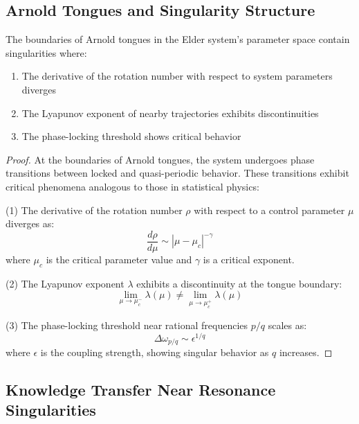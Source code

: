 \subsection{Arnold Tongues and Singularity Structure}

\begin{theorem}
The boundaries of Arnold tongues in the Elder system's parameter space contain singularities where:
\begin{enumerate}
    \item The derivative of the rotation number with respect to system parameters diverges
    \item The Lyapunov exponent of nearby trajectories exhibits discontinuities
    \item The phase-locking threshold shows critical behavior
\end{enumerate}
\end{theorem}

\begin{proof}
At the boundaries of Arnold tongues, the system undergoes phase transitions between locked and quasi-periodic behavior. These transitions exhibit critical phenomena analogous to those in statistical physics:

(1) The derivative of the rotation number $\rho$ with respect to a control parameter $\mu$ diverges as:
\begin{equation}
\frac{d\rho}{d\mu} \sim |\mu - \mu_c|^{-\gamma}
\end{equation}
where $\mu_c$ is the critical parameter value and $\gamma$ is a critical exponent.

(2) The Lyapunov exponent $\lambda$ exhibits a discontinuity at the tongue boundary:
\begin{equation}
\lim_{\mu \to \mu_c^-} \lambda(\mu) \neq \lim_{\mu \to \mu_c^+} \lambda(\mu)
\end{equation}

(3) The phase-locking threshold near rational frequencies $p/q$ scales as:
\begin{equation}
\Delta \omega_{p/q} \sim \epsilon^{1/q}
\end{equation}
where $\epsilon$ is the coupling strength, showing singular behavior as $q$ increases.
\end{proof}

\subsection{Knowledge Transfer Near Resonance Singularities}

